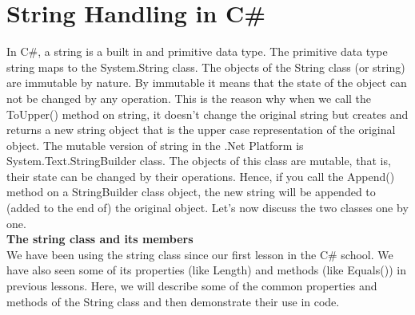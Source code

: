 \section{String Handling in C\#}

In C\#, a string is a built in and primitive data type. The primitive data type string maps to the System.String class. The objects of the String
class (or string) are immutable by nature. By immutable it means that the state of the object can not be changed by
any operation. This is the reason why when we call the ToUpper() method on string, it doesn’t change the original
string but creates and returns a new string object that is the upper case representation of the original object. The
mutable version of string in the .Net Platform is System.Text.StringBuilder class. The objects of this class are
mutable, that is, their state can be changed by their operations. Hence, if you call the Append() method on a
StringBuilder class object, the new string will be appended to (added to the end of) the original object. Let’s now
discuss the two classes one by one.\\

\textbf{The string class and its members}\\

We have been using the string class since our first lesson in the C\# school. We have also seen some of its properties
(like Length) and methods (like Equals()) in previous lessons. Here, we will describe some of the common
properties and methods of the String class and then demonstrate their use in code.

